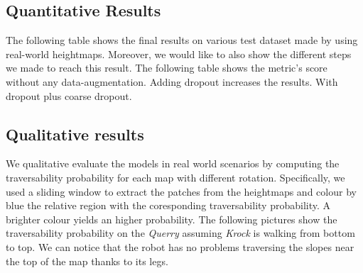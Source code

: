 \documentclass[../document.tex]{subfiles}
\begin{document}
\subsection{Quantitative Results}
The following table shows the final results on various test dataset made by using real-world heightmaps. 
Moreover, we would like to also show the different steps we made to reach this result. The following table shows the metric's score without any data-augmentation.
Adding dropout increases the results.
With dropout plus coarse dropout.
\subsection{Qualitative results}
We qualitative evaluate the models in real world scenarios by computing the traversability probability for each map with different rotation. Specifically, we used a sliding window to extract the patches from the heightmaps and colour by blue the relative region with the coresponding traversability probability. A brighter colour yields an higher probability. The following pictures show the traversability probability on the \emph{Querry} assuming \emph{Krock} is walking from bottom to top.
We can notice that the robot has no problems traversing the slopes near the top of the map thanks to its legs.
\end{document}
